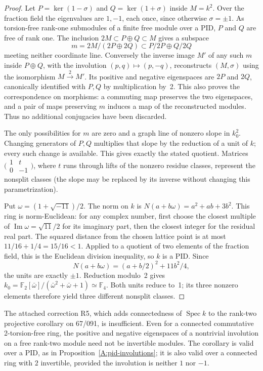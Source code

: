 \begin{proof}
Let $P=\ker(1-\sigma)$ and $Q=\ker(1+\sigma)$ inside $M=k^2$.
Over the fraction field the eigenvalues are $1,-1$, each once,
since otherwise $\sigma=\pm1$. As torsion-free rank-one submodules
of a finite free module over a PID, $P$ and $Q$ are free of rank one.
The inclusion $2M\subset P\oplus Q\subset M$ gives a subspace
\[
 m=2M/(2P\oplus2Q)\subset P/2P\oplus Q/2Q
\]
meeting neither coordinate line. Conversely the inverse image
$M'$ of any such $m$ inside $P\oplus Q$, with the involution
$(p,q)\mapsto(p,-q)$, reconstructs $(M,\sigma)$ using the
isomorphism $M\xrightarrow{2}M'$. Its positive and negative
eigenspaces are $2P$ and $2Q$, canonically identified with
$P,Q$ by multiplication by~2. This also proves the correspondence
on morphisms: a commuting map preserves the two eigenspaces, and
a pair of maps preserving $m$ induces a map of the reconstructed
modules. Thus no additional conjugacies have been discarded.

The only possibilities for $m$ are zero and a graph line of
nonzero slope in $k_0^2$. Changing generators of $P,Q$ multiplies
that slope by the reduction of a unit of $k$; every such change is
available. This gives exactly the stated quotient. Matrices
$\bigl(\begin{smallmatrix}1&t\\0&-1\end{smallmatrix}\bigr)$,
where $t$ runs through lifts of the nonzero residue classes,
represent the nonsplit classes (the slope may be replaced by its
inverse without changing this parametrization).

Put $\omega=(1+\sqrt{-11})/2$. The norm on $k$ is
$N(a+b\omega)=a^2+ab+3b^2$. This ring is norm-Euclidean:
for any complex number, first choose the closest multiple of
$\operatorname{Im}\omega=\sqrt{11}/2$ for its imaginary part,
then the closest integer for the residual real part. The squared
distance from the chosen lattice point is at most
$11/16+1/4=15/16<1$. Applied to a quotient of two elements of the
fraction field, this is the Euclidean division inequality, so $k$
is a PID. Since
\[
 N(a+b\omega)=(a+b/2)^2+11b^2/4,
\]
the units are exactly $\pm1$. Reduction modulo~2 gives
$k_0=\mathbb F_2[\bar\omega]/(\bar\omega^2+\bar\omega+1)
\simeq\mathbb F_4$. Both units reduce to~1; its three nonzero
elements therefore yield three different nonsplit classes.
\end{proof}

\begin{proposition}
\label{A:eigenmodule-correction}
The attached correction R5, which adds connectedness of
$\operatorname{Spec}k$ to the rank-two projective corollary on
67/091, is insufficient. Even for a connected commutative
2-torsion-free ring, the positive and negative eigenspaces of a
nontrivial involution on a free rank-two module need not be
invertible modules. The corollary is valid over a PID, as in
Proposition~\ref{A:pid-involutions}; it is also valid over a
connected ring with $2$ invertible, provided the involution is
neither $1$ nor $-1$.
\end{proposition}

